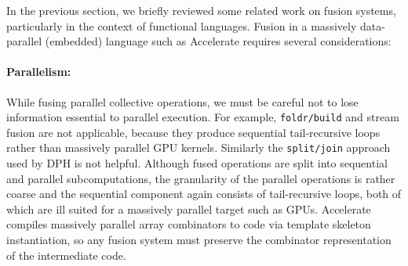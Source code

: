 % 
% 
% 

In the previous section, we briefly reviewed some related work on fusion
systems, particularly in the context of functional languages. Fusion in a
massively data-parallel (embedded) language such as Accelerate requires several
considerations:

\paragraph{Parallelism:} While fusing parallel collective operations, we must be
careful not to lose information essential to parallel execution. For example,
\texttt{foldr/build} and stream
fusion are not applicable, because they produce sequential tail-recursive loops
rather than massively parallel GPU kernels. Similarly the
\texttt{split/join} approach used by
DPH is not helpful. Although fused operations are
split into sequential and parallel subcomputations, the granularity of the
parallel operations is rather coarse and the sequential component again consists
of tail-recursive loops, both of which are ill suited for a massively parallel
target such as GPUs. Accelerate compiles massively parallel array
combinators to  code via template skeleton instantiation, so any
fusion system must preserve the combinator representation of the intermediate
code.

